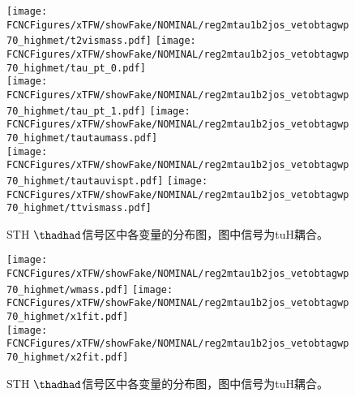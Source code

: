\begin{figure}[H]
\centering
\texttt{[image: \\FCNCFigures/xTFW/showFake/NOMINAL/reg2mtau1b2jos\_vetobtagwp70\_highmet/t2vismass.pdf]}
\texttt{[image: \\FCNCFigures/xTFW/showFake/NOMINAL/reg2mtau1b2jos\_vetobtagwp70\_highmet/tau\_pt\_0.pdf]}
\\
\texttt{[image: \\FCNCFigures/xTFW/showFake/NOMINAL/reg2mtau1b2jos\_vetobtagwp70\_highmet/tau\_pt\_1.pdf]}
\texttt{[image: \\FCNCFigures/xTFW/showFake/NOMINAL/reg2mtau1b2jos\_vetobtagwp70\_highmet/tautaumass.pdf]}
\\
\texttt{[image: \\FCNCFigures/xTFW/showFake/NOMINAL/reg2mtau1b2jos\_vetobtagwp70\_highmet/tautauvispt.pdf]}
\texttt{[image: \\FCNCFigures/xTFW/showFake/NOMINAL/reg2mtau1b2jos\_vetobtagwp70\_highmet/ttvismass.pdf]}
\\
\caption{STH $\thadhad$信号区中各变量的分布图，图中信号为tuH耦合。}
\label{fig:var_reg2mtau1b2jos_vetobtagwp70_highmet_3}
\end{figure}
\begin{figure}[H]
\centering
\texttt{[image: \\FCNCFigures/xTFW/showFake/NOMINAL/reg2mtau1b2jos\_vetobtagwp70\_highmet/wmass.pdf]}
\texttt{[image: \\FCNCFigures/xTFW/showFake/NOMINAL/reg2mtau1b2jos\_vetobtagwp70\_highmet/x1fit.pdf]}
\\
\texttt{[image: \\FCNCFigures/xTFW/showFake/NOMINAL/reg2mtau1b2jos\_vetobtagwp70\_highmet/x2fit.pdf]}
\caption{STH $\thadhad$信号区中各变量的分布图，图中信号为tuH耦合。}
\label{fig:var_reg2mtau1b2jos_vetobtagwp70_highmet}
\end{figure}

